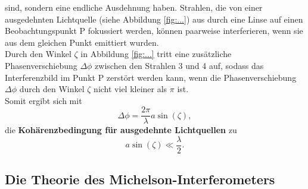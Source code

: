 sind, sondern eine endliche Ausdehnung haben. Strahlen, die von einer ausgedehnten Lichtquelle
(siehe Abbildung \ref{fig:...}) aus durch eine Linse auf einen Beobachtungspunkt P fokussiert
werden, können paarweise interferieren, wenn sie aus dem gleichen Punkt emittiert wurden.\\
Durch den Winkel $\zeta$ in Abbildung \ref{fig:...} tritt eine zusätzliche Phasenverschiebung
$\Delta \phi$ zwischen den Strahlen 3 und 4 auf, sodass das Interferenzbild im Punkt P
zerstört werden kann, wenn die Phasenverschiebung $\Delta \phi$ durch den Winkel $\zeta$ nicht
viel kleiner als $\pi$ ist.
\\Somit ergibt sich mit
\begin{equation}
	\Delta \phi = \frac{2\pi}{\lambda} a \sin(\zeta) \mathrm{,}
\end{equation}
die \textbf{Kohärenzbedingung für ausgedehnte Lichtquellen} zu
\begin{equation}
	a \sin(\zeta) \ll \frac{\lambda}{2} \mathrm{.}
\end{equation}


\subsection{Die Theorie des Michelson-Interferometers}

